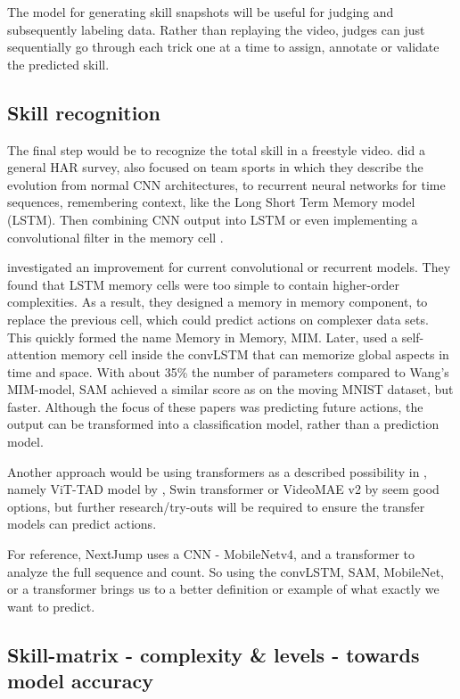 The model for generating skill snapshots will
be useful for judging and subsequently labeling
data. Rather than replaying the video, judges can
just sequentially go through each trick one at a
time to assign, annotate or validate the predicted
skill.

\subsection{Skill recognition}
\label{subsec:skill-recognition}

The final step would be to recognize the total skill in a freestyle video.
\textcite{Yin_2024} did a general HAR survey, also focused on team sports in which they describe the evolution from normal CNN architectures, to recurrent neural networks for time sequences, remembering context, like the Long Short Term Memory model (LSTM). Then combining CNN output into LSTM or even implementing a convolutional filter in the memory cell \autocite{Shi_2015}.

\textcite{Wang_2019} investigated an improvement for current convolutional or recurrent models. They found that LSTM memory cells were too simple to contain higher-order complexities. As a result, they designed a memory in memory component, to replace the previous cell, which could predict actions on complexer data sets. This quickly formed the name Memory in Memory, MIM. Later, \textcite{Lin_2020} used a self-attention memory cell inside the convLSTM that can memorize global aspects in time and space. With about 35\% the number of parameters compared to Wang's MIM-model, SAM achieved a similar score as on the moving MNIST dataset, but faster. Although the focus of these papers was predicting future actions, the output can be transformed into a classification model, rather than a prediction model.

Another approach would be using transformers as a described possibility in \textcite{Yin_2024}, namely ViT-TAD model by \textcite{Yang_2023}, Swin transformer \textcite{Liu_2021} or VideoMAE v2 by \textcite{Wang_2023} seem good options, but further research/try-outs will be required to ensure the transfer models can predict actions.

For reference, NextJump uses a CNN - MobileNetv4, \autocite{MobileNetv4_2024} and a transformer to analyze the full sequence and count. So using the convLSTM, SAM, MobileNet, or a transformer brings us to a better definition or example of what exactly we want to predict.


\subsection{Skill-matrix - complexity \& levels - towards model accuracy}
\label{subsec:skillcomplexiteit}

